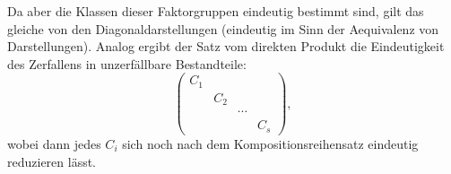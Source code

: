 Da aber die Klassen dieser Faktorgruppen eindeutig bestimmt sind, gilt das gleiche von den Diagonaldarstellungen (eindeutig im Sinn der Aequivalenz von Darstellungen). Analog ergibt der Satz vom direkten Produkt die Eindeutigkeit des \guillemotleft Zerfallens\guillemotright{} in \guillemotleft unzerfällbare\guillemotright{} Bestandteile:
\[
\begin{pmatrix}
C_1&&&\\
&C_2&&\\
&&\cdots&\\
&&&C_s
\end{pmatrix},
\]
wobei dann jedes $C_i$ sich noch nach dem Kompositionsreihensatz eindeutig reduzieren lässt.
